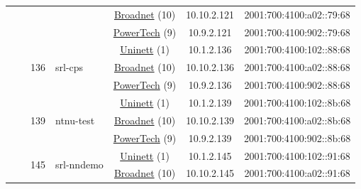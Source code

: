\begin{small}
\begin{center}
\begin{longtable}{|c|c|c|c|c|c|c|c|}
  &  &  &  & \multicolumn{2}{|c|}{\tiny{\href{https://www.broadnet.no}{Broadnet} (10)}} & \tiny{10.10.2.121} & \tiny{2001:700:4100:a02::79:68} \\* \cline{5-5}\cline{6-6}\cline{7-7}\cline{8-8}
  &  &  &  & \multicolumn{2}{|c|}{\tiny{\href{http://www.powertech.no}{PowerTech} (9)}} & \tiny{10.9.2.121} & \tiny{2001:700:4100:902::79:68} \\* \cline{3-3}\cline{4-4}\cline{5-5}\cline{6-6}\cline{7-7}\cline{8-8}
  &  & \multirow{3}{*}{\tiny{136}} & \multicolumn{1}{|l|}{\multirow{3}{*}{\tiny{srl-cps}}} & \multicolumn{2}{|c|}{\tiny{\href{https://www.uninett.no}{Uninett} (1)}} & \tiny{10.1.2.136} & \tiny{2001:700:4100:102::88:68} \\* \cline{5-5}\cline{6-6}\cline{7-7}\cline{8-8}
  &  &  &  & \multicolumn{2}{|c|}{\tiny{\href{https://www.broadnet.no}{Broadnet} (10)}} & \tiny{10.10.2.136} & \tiny{2001:700:4100:a02::88:68} \\* \cline{5-5}\cline{6-6}\cline{7-7}\cline{8-8}
  &  &  &  & \multicolumn{2}{|c|}{\tiny{\href{http://www.powertech.no}{PowerTech} (9)}} & \tiny{10.9.2.136} & \tiny{2001:700:4100:902::88:68} \\* \cline{3-3}\cline{4-4}\cline{5-5}\cline{6-6}\cline{7-7}\cline{8-8}
  &  & \multirow{3}{*}{\tiny{139}} & \multicolumn{1}{|l|}{\multirow{3}{*}{\tiny{ntnu-test}}} & \multicolumn{2}{|c|}{\tiny{\href{https://www.uninett.no}{Uninett} (1)}} & \tiny{10.1.2.139} & \tiny{2001:700:4100:102::8b:68} \\* \cline{5-5}\cline{6-6}\cline{7-7}\cline{8-8}
  &  &  &  & \multicolumn{2}{|c|}{\tiny{\href{https://www.broadnet.no}{Broadnet} (10)}} & \tiny{10.10.2.139} & \tiny{2001:700:4100:a02::8b:68} \\* \cline{5-5}\cline{6-6}\cline{7-7}\cline{8-8}
  &  &  &  & \multicolumn{2}{|c|}{\tiny{\href{http://www.powertech.no}{PowerTech} (9)}} & \tiny{10.9.2.139} & \tiny{2001:700:4100:902::8b:68} \\* \cline{3-3}\cline{4-4}\cline{5-5}\cline{6-6}\cline{7-7}\cline{8-8}
  &  & \multirow{3}{*}{\tiny{145}} & \multicolumn{1}{|l|}{\multirow{3}{*}{\tiny{srl-nndemo}}} & \multicolumn{2}{|c|}{\tiny{\href{https://www.uninett.no}{Uninett} (1)}} & \tiny{10.1.2.145} & \tiny{2001:700:4100:102::91:68} \\* \cline{5-5}\cline{6-6}\cline{7-7}\cline{8-8}
  &  &  &  & \multicolumn{2}{|c|}{\tiny{\href{https://www.broadnet.no}{Broadnet} (10)}} & \tiny{10.10.2.145} & \tiny{2001:700:4100:a02::91:68} \\* \cline{5-5}\cline{6-6}\cline{7-7}\cline{8-8}

\end{longtable}
\end{center}
\end{small}
